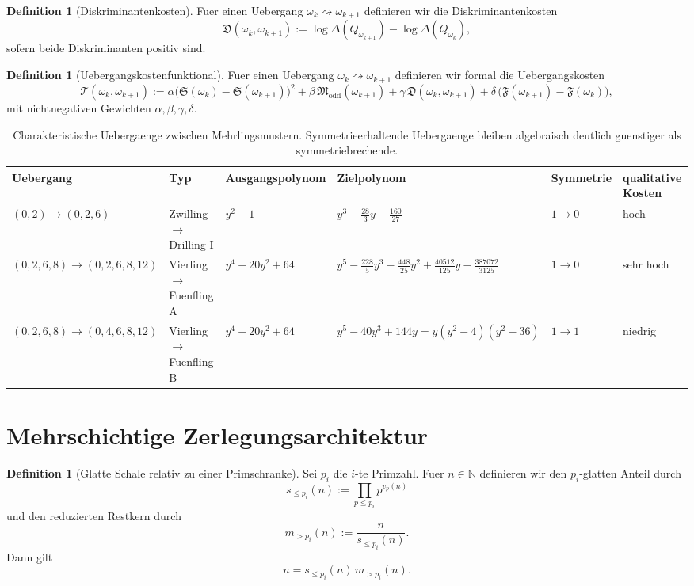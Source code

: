 \documentclass[11pt,a4paper]{article}
\theoremstyle{definition}
\newtheorem{definition}[satz]{Definition}
\begin{document}
\begin{definition}[Diskriminantenkosten]
Fuer einen Uebergang \(\omega_k\rightsquigarrow\omega_{k+1}\) definieren wir die Diskriminantenkosten
\[
\mathfrak D(\omega_k,\omega_{k+1})
:=
\log \Delta(Q_{\omega_{k+1}})
-\log \Delta(Q_{\omega_k}),
\]
sofern beide Diskriminanten positiv sind.
\end{definition}

\begin{definition}[Uebergangskostenfunktional]
Fuer einen Uebergang \(\omega_k\rightsquigarrow\omega_{k+1}\) definieren wir formal die Uebergangskosten
\[
\mathcal T(\omega_k,\omega_{k+1})
:=
\alpha\bigl(\mathfrak S(\omega_k)-\mathfrak S(\omega_{k+1})\bigr)^2
+\beta\,\mathfrak M_{\mathrm{odd}}(\omega_{k+1})
+\gamma\,\mathfrak D(\omega_k,\omega_{k+1})
+\delta\,\bigl(\mathfrak F(\omega_{k+1})-\mathfrak F(\omega_k)\bigr),
\]
mit nichtnegativen Gewichten \(\alpha,\beta,\gamma,\delta\).
\end{definition}

\begin{table}[H]
\centering
\begin{tabular}{llllll}
\toprule
Uebergang & Typ & Ausgangspolynom & Zielpolynom & Symmetrie & qualitative Kosten \\
\midrule
\((0,2)\to(0,2,6)\)
&
Zwilling \(\to\) Drilling I
&
\(\displaystyle y^2-1\)
&
\(\displaystyle y^3-\frac{28}{3}y-\frac{160}{27}\)
&
\(1\to 0\)
&
hoch
\\[0.8em]
\((0,2,6,8)\to(0,2,6,8,12)\)
&
Vierling \(\to\) Fuenfling A
&
\(\displaystyle y^4-20y^2+64\)
&
\(\displaystyle y^5-\frac{228}{5}y^3-\frac{448}{25}y^2+\frac{40512}{125}y-\frac{387072}{3125}\)
&
\(1\to 0\)
&
sehr hoch
\\[1.0em]
\((0,2,6,8)\to(0,4,6,8,12)\)
&
Vierling \(\to\) Fuenfling B
&
\(\displaystyle y^4-20y^2+64\)
&
\(\displaystyle y^5-40y^3+144y = y(y^2-4)(y^2-36)\)
&
\(1\to 1\)
&
niedrig
\\
\bottomrule
\end{tabular}
\caption{Charakteristische Uebergaenge zwischen Mehrlingsmustern. Symmetrieerhaltende Uebergaenge bleiben algebraisch deutlich guenstiger als symmetriebrechende.}
\end{table}

\section{Mehrschichtige Zerlegungsarchitektur}

\begin{definition}[Glatte Schale relativ zu einer Primschranke]
Sei \(p_i\) die \(i\)-te Primzahl. Fuer \(n\in\mathbb N\) definieren wir den \(p_i\)-glatten Anteil durch
\[
s_{\le p_i}(n):=\prod_{p\le p_i} p^{v_p(n)}
\]
und den reduzierten Restkern durch
\[
m_{>p_i}(n):=\frac{n}{s_{\le p_i}(n)}.
\]
Dann gilt
\[
n=s_{\le p_i}(n)\,m_{>p_i}(n).
\]
\end{definition}
\end{document}
